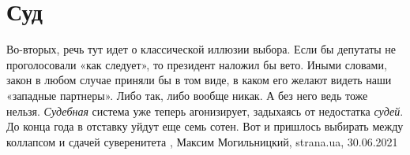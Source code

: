  
 
 
 
 
\chapter{Суд}

Во-вторых, речь тут идет о классической иллюзии выбора. Если бы депутаты не
проголосовали «как следует», то президент наложил бы вето. Иными словами, закон
в любом случае приняли бы в том виде, в каком его желают видеть наши «западные
партнеры». Либо так, либо вообще никак.  А без него ведь тоже нельзя. \emph{Судебная}
система уже теперь агонизирует, задыхаясь от недостатка \emph{судей}. До конца года в
отставку уйдут еще семь сотен. Вот и пришлось выбирать между коллапсом и сдачей
суверенитета
, 
Максим Могильницкий, strana.ua, 30.06.2021

